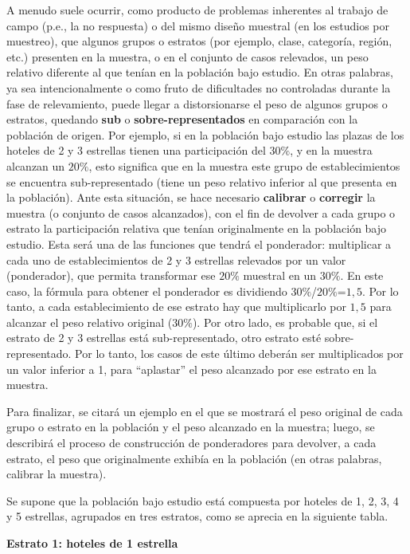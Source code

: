 \documentclass[
]{book}
\begin{document}
A menudo suele ocurrir, como producto de problemas inherentes al trabajo de campo (p.e., la no respuesta) o del mismo diseño muestral (en los estudios por muestreo), que algunos grupos o estratos (por ejemplo, clase, categoría, región, etc.) presenten en la muestra, o en el conjunto de casos relevados, un peso relativo diferente al que tenían en la población bajo estudio. En otras palabras, ya sea intencionalmente o como fruto de dificultades no controladas durante la fase de relevamiento, puede llegar a distorsionarse el peso de algunos grupos o estratos, quedando \textbf{sub} o \textbf{sobre-representados} en comparación con la población de origen. Por ejemplo, si en la población bajo estudio las plazas de los hoteles de 2 y 3 estrellas tienen una participación del \(30\%\), y en la muestra alcanzan un \(20\%\), esto significa que en la muestra este grupo de establecimientos se encuentra sub-representado (tiene un peso relativo inferior al que presenta en la población). Ante esta situación, se hace necesario \textbf{calibrar} o \textbf{corregir} la muestra (o conjunto de casos alcanzados), con el fin de devolver a cada grupo o estrato la participación relativa que tenían originalmente en la población bajo estudio. Esta será una de las funciones que tendrá el ponderador: multiplicar a cada uno de establecimientos de 2 y 3 estrellas relevados por un valor (ponderador), que permita transformar ese \(20\%\) muestral en un \(30\%\). En este caso, la fórmula para obtener el ponderador es dividiendo \(30\%\)/\(20\%\)=\(1,5\). Por lo tanto, a cada establecimiento de ese estrato hay que multiplicarlo por \(1,5\) para alcanzar el peso relativo original (\(30\%\)). Por otro lado, es probable que, si el estrato de 2 y 3 estrellas está sub-representado, otro estrato esté sobre-representado. Por lo tanto, los casos de este último deberán ser multiplicados por un valor inferior a 1, para ``aplastar'' el peso alcanzado por ese estrato en la muestra.

Para finalizar, se citará un ejemplo en el que se mostrará el peso original de cada grupo o estrato en la población y el peso alcanzado en la muestra; luego, se describirá el proceso de construcción de ponderadores para devolver, a cada estrato, el peso que originalmente exhibía en la población (en otras palabras, calibrar la muestra).

Se supone que la población bajo estudio está compuesta por hoteles de 1, 2, 3, 4 y 5 estrellas, agrupados en tres estratos, como se aprecia en la siguiente tabla.

\textbf{Estrato 1: hoteles de 1 estrella}
\end{document}
